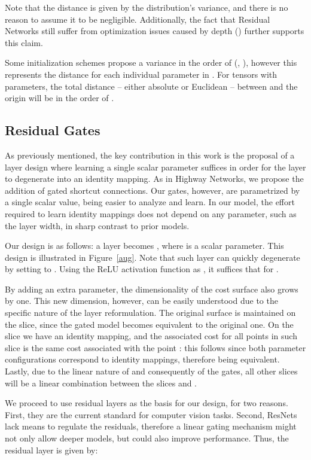 \documentclass{article} \RequirePackage{amsmath,amsthm,amsfonts,amssymb}
\begin{document}
Note that the distance is given by the distribution's variance, and there is no reason to assume it to be negligible. Additionally, the fact that Residual Networks still suffer from optimization issues caused by depth (\cite{stdepth}) further supports this claim. 

Some initialization schemes propose a variance in the order of  (\cite{glorotinit}, \cite{prelu}), however this represents the distance for each individual parameter in . For tensors with  parameters, the total distance --  either absolute or Euclidean --  between  and the origin will be in the order of .


\subsection{Residual Gates}

As previously mentioned, the key contribution in this work is the proposal of a layer design where learning a single scalar parameter suffices in order for the layer to degenerate into an identity mapping. As in Highway Networks, we propose the addition of gated shortcut connections. Our gates, however, are parametrized by a single scalar value, being easier to analyze and learn. In our model, the effort required to learn identity mappings does not depend on any parameter, such as the layer width, in sharp contrast to prior models.

Our design is as follows: a layer  becomes , where  is a scalar parameter. This design is illustrated in Figure~\ref{aug}. Note that such layer can quickly degenerate by setting  to . Using the ReLU activation function as , it suffices that  for .

By adding an extra parameter, the dimensionality of the cost surface also grows by one. This new dimension, however, can be easily understood due to the specific nature of the layer reformulation. The original surface is maintained on the  slice, since the gated model becomes equivalent to the original one. On the  slice we have an identity mapping, and the associated cost for all points in such slice is the same cost associated with the point : this follows since both parameter configurations correspond to identity mappings, therefore being equivalent. Lastly, due to the linear nature of   and consequently of the gates, all other slices  will be a linear combination between the slices  and .

We proceed to use residual layers as the basis for our design, for two reasons. First, they are the current standard for computer vision tasks. Second, ResNets lack means to regulate the residuals, therefore a linear gating mechanism might not only allow deeper models, but could also improve performance. Thus, the residual layer is given by:
\end{document}
